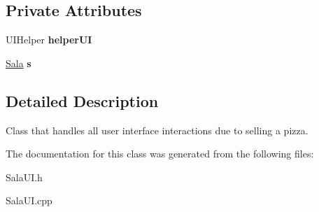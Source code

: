\subsection*{Private Attributes}
\begin{CompactItemize}
\item 
\hypertarget{class_sala_u_i_165ca02db075e280199e0970e3465900}{
UIHelper {\bf helper\-UI}}
\label{class_sala_u_i_165ca02db075e280199e0970e3465900}

\item 
\hypertarget{class_sala_u_i_03c7c0ace395d80182db07ae2c30f034}{
\hyperlink{class_sala}{Sala} {\bf s}}
\label{class_sala_u_i_03c7c0ace395d80182db07ae2c30f034}

\end{CompactItemize}


\subsection{Detailed Description}
Class that handles all user interface interactions due to selling a pizza. 



The documentation for this class was generated from the following files:\begin{CompactItemize}
\item 
Sala\-UI.h\item 
Sala\-UI.cpp\end{CompactItemize}
